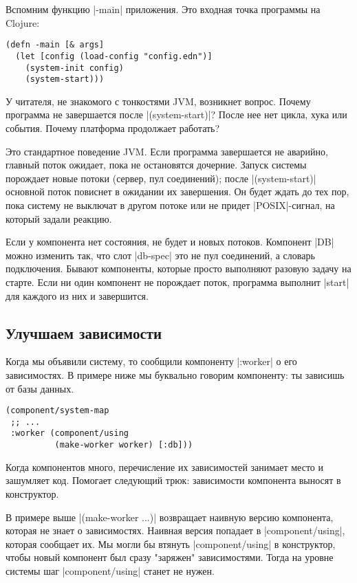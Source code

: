 Вспомним функцию \spverb|-main| приложения. Это входная точка программы на
Clojure:

\begin{verbatim}
(defn -main [& args]
  (let [config (load-config "config.edn")]
    (system-init config)
    (system-start)))
\end{verbatim}

У читателя, не знакомого с тонкостями JVM, возникнет вопрос. Почему программа не
завершается после \spverb|(system-start)|? После нее нет цикла, хука или
события. Почему платформа продолжает работать?

Это стандартное поведение JVM. Если программа завершается не аварийно, главный
поток ожидает, пока не остановятся дочерние. Запуск системы порождает новые
потоки (сервер, пул соединений); после \spverb|(system-start)| основной поток
повиснет в ожидании их завершения. Он будет ждать до тех пор, пока систему не
выключат в другом потоке или не придет \spverb|POSIX|-сигнал, на который задали
реакцию.

Если у компонента нет состояния, не будет и новых потоков. Компонент \spverb|DB|
можно изменить так, что слот \spverb|db-spec| это не пул соединений, а словарь
подключения. Бывают компоненты, которые просто выполняют разовую задачу на
старте. Если ни один компонент не порождает поток, программа выполнит
\spverb|start| для каждого из них и завершится.


\subsection{Улучшаем зависимости}

Когда мы объявили систему, то сообщили компоненту \spverb|:worker| о его
зависимостях. В примере ниже мы буквально говорим компоненту: ты зависишь от
базы данных.

\begin{verbatim}
(component/system-map
 ;; ...
 :worker (component/using
          (make-worker worker) [:db]))
\end{verbatim}

Когда компонентов много, перечисление их зависимостей занимает место и зашумляет
код. Помогает следующий трюк: зависимости компонента выносят в конструктор.

В примере выше \spverb|(make-worker {...})| возвращает наивную версию компонента,
которая не знает о зависимостях. Наивная версия попадает в \spverb|component/using|,
которая сообщает их. Мы могли бы втянуть \spverb|component/using| в конструктор, чтобы
новый компонент был сразу "заряжен" зависимостями. Тогда на уровне системы шаг
\spverb|component/using| станет не нужен.

